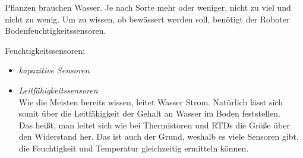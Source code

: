 		Pflanzen brauchen Wasser. Je nach Sorte mehr oder weniger, nicht zu viel und nicht zu wenig. Um zu wissen, ob bewässert werden soll, benötigt der Roboter Bodenfeuchtigkeitssensoren.
		
		\begin{description}
			\item {Feuchtigkeitssensoren:}
			\begin{itemize}
				\item {\textit{kapazitive Sensoren}}\\
				
				\item {\textit{Leitfähigkeitssensoren}}\\
				Wie die Meisten bereits wissen, leitet Wasser Strom. Natürlich lässt sich somit über die Leitfähigkeit der Gehalt an Wasser im Boden feststellen.\\
				Das heißt, man leitet sich wie bei Thermistoren und RTDs die Größe über den Widerstand her. Das ist auch der Grund, weshalb es viele Sensoren gibt, die Feuchtigkeit und Temperatur gleichzeitig ermitteln können.
			\end{itemize}
		\end{description}
		